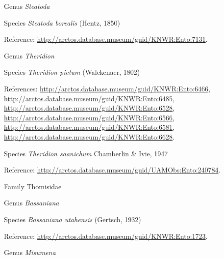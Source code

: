 \documentclass[9pt, article]{memoir}
\begin{document}
\begin{multicols}{2}
\vspace{6pt}\noindent\hspace{30pt}Genus \textit{Steatoda}


\vspace{6pt}\noindent\hspace{36pt}Species \textit{Steatoda borealis} (Hentz, 1850)


\vspace{6pt}Reference: 
\url{http://arctos.database.museum/guid/KNWR:Ento:7131}.

\vspace{6pt}\noindent\hspace{30pt}Genus \textit{Theridion}


\vspace{6pt}\noindent\hspace{36pt}Species \textit{Theridion pictum} (Walckenaer, 1802)


\vspace{6pt}References: 
\url{http://arctos.database.museum/guid/KNWR:Ento:6466}, 
\url{http://arctos.database.museum/guid/KNWR:Ento:6485}, 
\url{http://arctos.database.museum/guid/KNWR:Ento:6528}, 
\url{http://arctos.database.museum/guid/KNWR:Ento:6566}, 
\url{http://arctos.database.museum/guid/KNWR:Ento:6581}, 
\url{http://arctos.database.museum/guid/KNWR:Ento:6628}.

\vspace{6pt}\noindent\hspace{36pt}Species \textit{Theridion saanichum} Chamberlin \& Ivie, 1947


\vspace{6pt}Reference: 
\url{http://arctos.database.museum/guid/UAMObs:Ento:240784}.

\vspace{6pt}\noindent\hspace{24pt}Family Thomisidae


\vspace{6pt}\noindent\hspace{30pt}Genus \textit{Bassaniana}


\vspace{6pt}\noindent\hspace{36pt}Species \textit{Bassaniana utahensis} (Gertsch, 1932)


\vspace{6pt}Reference: 
\url{http://arctos.database.museum/guid/KNWR:Ento:1723}.

\vspace{6pt}\noindent\hspace{30pt}Genus \textit{Misumena}



\end{multicols}
\end{document}
